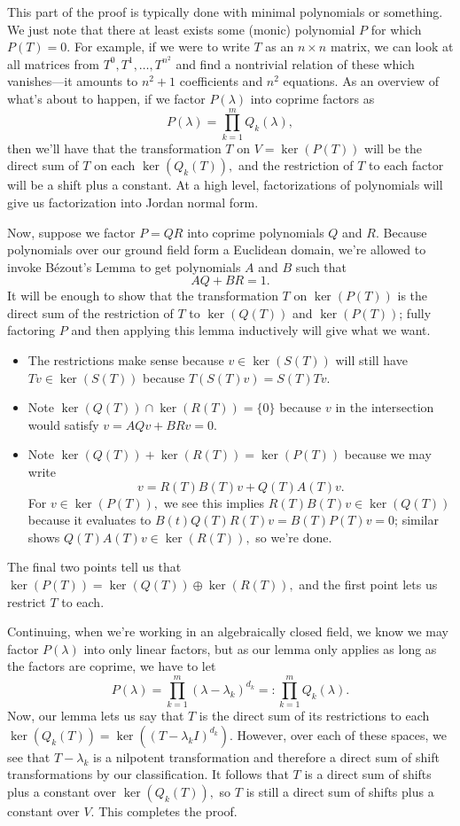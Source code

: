 This part of the proof is typically done with minimal polynomials or something. We just note that there at least exists some (monic) polynomial $P$ for which $P(T)=0.$ For example, if we were to write $T$ as an $n\times n$ matrix, we can look at all matrices from $T^0,T^1,\ldots,T^{n^2}$ and find a nontrivial relation of these which vanishes---it amounts to $n^2+1$ coefficients and $n^2$ equations. As an overview of what's about to happen, if we factor $P(\lambda)$ into coprime factors as
\[P(\lambda)=\prod_{k=1}^mQ_k(\lambda),\]
then we'll have that the transformation $T$ on $V=\ker(P(T))$ will be the direct sum of $T$ on each $\ker(Q_k(T)),$ and the restriction of $T$ to each factor will be a shift plus a constant. At a high level, factorizations of polynomials will give us factorization into Jordan normal form.

Now, suppose we factor $P=QR$ into coprime polynomials $Q$ and $R.$ Because polynomials over our ground field form a Euclidean domain, we're allowed to invoke B\'ezout's Lemma to get polynomials $A$ and $B$ such that
\[AQ+BR=1.\]
It will be enough to show that the transformation $T$ on $\ker(P(T))$ is the direct sum of the restriction of $T$ to $\ker(Q(T))$ and $\ker(P(T))$; fully factoring $P$ and then applying this lemma inductively will give what we want.
\begin{itemize}
    \item The restrictions make sense because $v\in\ker(S(T))$ will still have $Tv\in\ker(S(T))$ because $T(S(T)v)=S(T)Tv$.
    \item Note $\ker(Q(T))\cap\ker(R(T))=\{0\}$ because $v$ in the intersection would satisfy $v=AQv+BRv=0.$
    \item Note $\ker(Q(T))+\ker(R(T))=\ker(P(T))$ because we may write
    \[v=R(T)B(T)v+Q(T)A(T)v.\]
    For $v\in\ker(P(T)),$ we see this implies $R(T)B(T)v\in\ker(Q(T))$ because it evaluates to $B(t)Q(T)R(T)v=B(T)P(T)v=0$; similar shows $Q(T)A(T)v\in\ker(R(T)),$ so we're done.
\end{itemize}
The final two points tell us that $\ker(P(T))=\ker(Q(T))\oplus\ker(R(T)),$ and the first point lets us restrict $T$ to each.

Continuing, when we're working in an algebraically closed field, we know we may factor $P(\lambda)$ into only linear factors, but as our lemma only applies as long as the factors are coprime, we have to let
\[P(\lambda)=\prod_{k=1}^m(\lambda-\lambda_k)^{d_k}=:\prod_{k=1}^mQ_k(\lambda).\]
Now, our lemma lets us say that $T$ is the direct sum of its restrictions to each $\ker(Q_k(T))=\ker\left((T-\lambda_kI)^{d_k}\right).$ However, over each of these spaces, we see that $T-\lambda_k$ is a nilpotent transformation and therefore a direct sum of shift transformations by our classification. It follows that $T$ is a direct sum of shifts plus a constant over $\ker(Q_k(T)),$ so $T$ is still a direct sum of shifts plus a constant over $V.$ This completes the proof.


